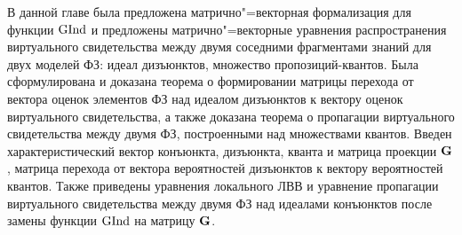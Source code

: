 В данной главе была предложена матрично"=векторная формализация для функции $\mathrm{GInd}$ и предложены матрично"=векторные уравнения распространения виртуального свидетельства между двумя соседними фрагментами знаний для двух моделей ФЗ: идеал дизъюнктов, множество пропозиций-квантов. Была сформулирована и доказана теорема о формировании матрицы перехода от вектора оценок элементов ФЗ над идеалом дизъюнктов к вектору оценок виртуального свидетельства, а также доказана теорема о пропагации виртуального свидетельства между двумя ФЗ, построенными над множествами квантов. Введен характеристический вектор конъюнкта, дизъюнкта,  кванта и матрица проекции $\mathbf{G}$, матрица перехода от вектора вероятностей дизъюнктов к вектору вероятностей квантов. Также приведены уравнения локального ЛВВ и уравнение пропагации виртуального свидетельства между двумя ФЗ над идеалами конъюнктов после замены функции $\mathrm{GInd}$  на матрицу $\mathbf{G}$.